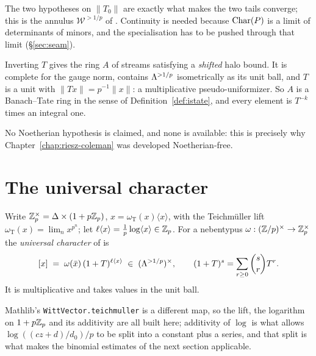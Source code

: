 The two hypotheses on $\lVert T_0\rVert$ are exactly what makes the two tails converge; this is
the annulus $\mathcal{W}^{>1/p}$ of \cite{LWX}.  Continuity is needed because $\operatorname{Char}(P)$ is a
limit of determinants of minors, and the specialisation has to be pushed through that limit
(\S\ref{sec:seam}).

\begin{proposition}[{The Banach--Tate ring $A = \Lhalo[1/T]$}]
  \label{prop:halotate}
  \leanok
  Inverting $T$ gives the ring $A$ of streams satisfying a \emph{shifted} halo bound.  It is
  complete for the gauge norm, contains $\Lambda^{>1/p}$ isometrically as its unit ball, and $T$ is a
  unit with $\lVert Tx\rVert = p^{-1}\lVert x\rVert$: a multiplicative pseudo-uniformizer.  So
  $A$ is a Banach--Tate ring in the sense of Definition~\ref{def:istate}, and every element is
  $T^{-k}$ times an integral one.
\end{proposition}

No Noetherian hypothesis is claimed, and none is available: this is precisely why
Chapter~\ref{chap:riesz-coleman} was developed Noetherian-free.

\section{The universal character}

\begin{definition}
  \label{def:univchar}
  \leanok
  Write $\mathbb{Z}_p^{\times} = \Delta \times (1+p\mathbb{Z}_p)$, $x = \omega_{\mathrm{T}}(x)\langle x\rangle$,
  with the Teichm\"uller lift $\omega_{\mathrm{T}}(x) = \lim_n x^{p^n}$; let
  $\ell\langle x\rangle = \tfrac1p\log\langle x\rangle \in \mathbb{Z}_p$.  For a nebentypus
  $\omega : (\mathbb{Z}/p)^{\times}\to\mathbb{Z}_p^{\times}$ the \emph{universal character} of
  \cite[Notation 2.1]{LWX} is
  \[
    [x] \;=\; \omega(\bar x)\,(1+T)^{\ell\langle x\rangle} \;\in\; (\Lambda^{>1/p})^{\times},
    \qquad (1+T)^{s} = \sum_{r\geq 0}\binom{s}{r}T^{r} .
  \]
  It is multiplicative and takes values in the unit ball.
\end{definition}

Mathlib's \texttt{WittVector.teichmuller} is a different map, so the lift, the logarithm on
$1+p\mathbb{Z}_p$ and its additivity are all built here; additivity of $\log$ is what allows
$\log((cz+d)/d_0)/p$ to be split into a constant plus a series, and that split is what makes the
binomial estimates of the next section applicable.


